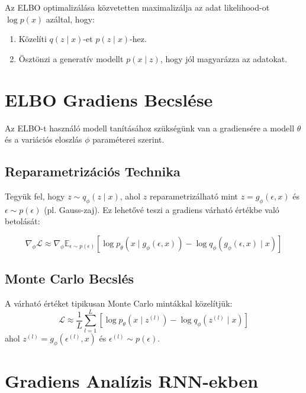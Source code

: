 Az ELBO optimalizálása közvetetten maximalizálja az adat likelihood-ot $\log p(x)$ azáltal, hogy:
\begin{enumerate}
    \item Közelíti $q(z \mid x)$-et $p(z \mid x)$-hez.
    \item Ösztönzi a generatív modellt $p(x \mid z)$, hogy jól magyarázza az adatokat.
\end{enumerate}

\section{ELBO Gradiens Becslése}

Az ELBO-t használó modell tanításához szükségünk van a gradiensére a modell $\theta$ és a variációs eloszlás $\phi$ paraméterei szerint.

\subsection{Reparametrizációs Technika}

Tegyük fel, hogy $z \sim q_\phi(z \mid x)$, ahol $z$ reparametrizálható mint $z = g_\phi(\epsilon, x)$ és $\epsilon \sim p(\epsilon)$ (pl. Gauss-zaj). Ez lehetővé teszi a gradiens várható értékbe való betolását:

\begin{equation}
\nabla_\phi \mathcal{L} \approx \nabla_\phi \mathbb{E}_{\epsilon \sim p(\epsilon)} \left[ \log p_\theta(x \mid g_\phi(\epsilon, x)) - \log q_\phi(g_\phi(\epsilon, x) \mid x) \right]
\end{equation}

\subsection{Monte Carlo Becslés}

A várható értéket tipikusan Monte Carlo mintákkal közelítjük:
\begin{equation}
\mathcal{L} \approx \frac{1}{L} \sum_{l=1}^L \left[ \log p_\theta(x \mid z^{(l)}) - \log q_\phi(z^{(l)} \mid x) \right]
\end{equation}
ahol $z^{(l)} = g_\phi(\epsilon^{(l)}, x)$ és $\epsilon^{(l)} \sim p(\epsilon)$.

\section{Gradiens Analízis RNN-ekben}

